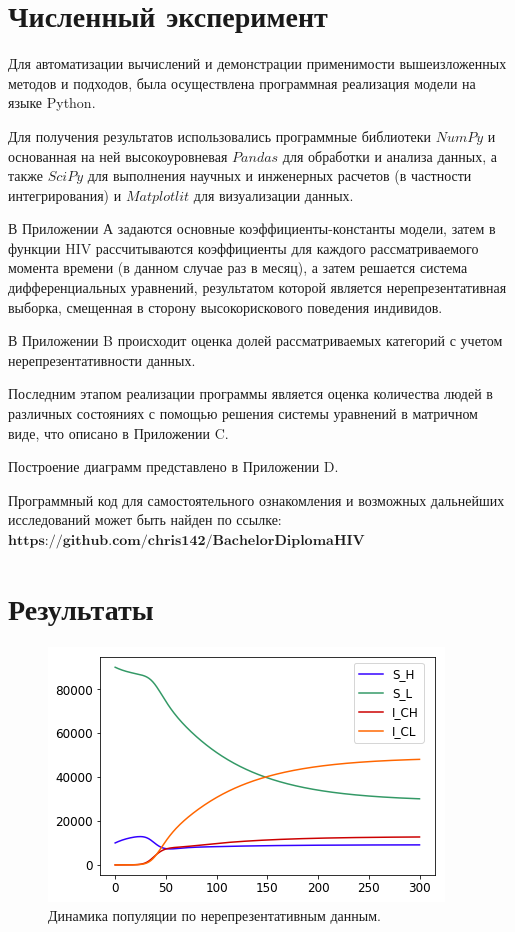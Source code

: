 \documentclass[a4paper]{report}
\begin{document}
	\section{Численный эксперимент}
	Для автоматизации вычислений и демонстрации применимости вышеизложенных методов и подходов, была осуществлена программная реализация модели на языке Python.
	
	Для получения результатов использовались программные библиотеки $NumPy$ и основанная на ней высокоуровневая $Pandas$ для обработки и анализа данных, а также $SciPy$ для выполнения научных и инженерных расчетов (в частности интегрирования) и $Matplotlit$ для визуализации данных. 
	
	В Приложении А задаются основные коэффициенты-константы модели, затем в функции HIV рассчитываются коэффициенты для каждого рассматриваемого момента времени (в данном случае раз в месяц), а затем решается система дифференциальных уравнений, результатом которой является нерепрезентативная выборка, смещенная в сторону высокорискового поведения индивидов.
	
	В Приложении B происходит оценка долей рассматриваемых категорий с учетом нерепрезентативности данных.
	
	Последним этапом реализации программы является оценка количества людей в различных состояниях с помощью решения системы уравнений в матричном виде, что описано в Приложении C.
	
	Построение диаграмм представлено в Приложении D.
	
	Программный код для самостоятельного ознакомления и возможных дальнейших исследований может быть найден по ссылке: $\textbf{https://github.com/chris142/BachelorDiplomaHIV}$	
	
	\newpage
	\section{Результаты}
	
	\begin{figure}[h!]
		\includegraphics{im1}
		\caption{Динамика популяции по нерепрезентативным данным.}
	\end{figure}
\end{document}
